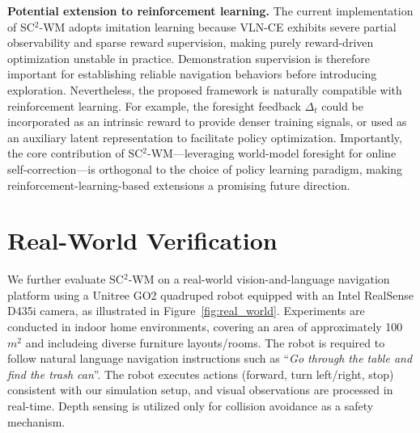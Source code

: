 \documentclass{article}
\theoremstyle{plain}
\theoremstyle{definition}
\theoremstyle{remark}
\begin{document}
\noindent\textbf{Potential extension to reinforcement learning.}
The current implementation of SC$^{2}$-WM adopts imitation learning because VLN-CE exhibits severe partial observability and sparse reward supervision, making purely reward-driven optimization unstable in practice. Demonstration supervision is therefore important for establishing reliable navigation behaviors before introducing exploration. Nevertheless, the proposed framework is naturally compatible with reinforcement learning. For example, the foresight feedback $\Delta_t$ could be incorporated as an intrinsic reward to provide denser training signals, or used as an auxiliary latent representation to facilitate policy optimization. Importantly, the core contribution of SC$^{2}$-WM—leveraging world-model foresight for online self-correction—is orthogonal to the choice of policy learning paradigm, making reinforcement-learning-based extensions a promising future direction.


\section{Real-World Verification}\label{sec:real}

We further evaluate SC$^{2}$-WM on a real-world vision-and-language navigation platform using a Unitree GO2 quadruped robot  equipped with an Intel RealSense D435i camera, as illustrated in Figure~\ref{fig:real_world}.
Experiments are conducted in indoor home environments, covering an area of approximately 100$m^2$ and includeing diverse furniture layouts/rooms.
The robot is required to follow natural language navigation instructions such as ``\textit{Go through the table and find the trash can}''.
The robot executes actions (forward, turn left/right, stop) consistent with our simulation setup, and visual observations are processed in real-time. Depth sensing is utilized only for collision avoidance as a safety mechanism.
\end{document}
